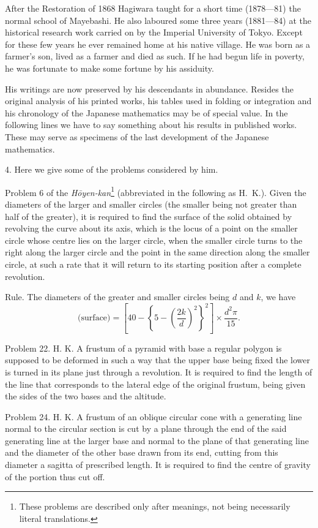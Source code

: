 \documentclass[11pt]{article}
\newcommand{\scanpage}[2]{\clearpage\setcounter{footnote}{0}\noindent{\footnotesize\color{gray}PDF page #1 · #2}\par\medskip}
\begin{document}
After the Restoration of 1868 Hagiwara taught for a short time (1878---81) the normal school of Mayebashi. He also laboured some three years (1881---84) at the historical research work carried on by the Imperial University of Tokyo. Except for these few years he ever remained home at his native village. He was born as a farmer's son, lived as a farmer and died as such. If he had begun life in poverty, he was fortunate to make some fortune by his assiduity.

His writings are now preserved by his descendants in abundance. Resides the original analysis of his printed works, his tables used in folding or integration and his chronology of the Japanese mathematics may be of special value. In the following lines we have to say something about his results in published works. These may serve as specimens of the last development of the Japanese mathematics.

4. Here we give some of the problems considered by him.

Problem 6 of the \emph{Hōyen-kan}\footnote{These problems are described only after meanings, not being necessarily literal translations.} (abbreviated in the following as H.~K.). Given the diameters of the larger and smaller circles (the smaller being not greater than half of the greater), it is required to find the surface of the solid obtained by revolving the curve about its axis, which is the locus of a point on the smaller circle whose centre lies on the larger circle, when the smaller circle turns to the right along the larger circle and the point in the same direction along the smaller circle, at such a rate that it will return to its starting position after a complete revolution.

\scanpage{0319}{printed page 305}
Rule. The diameters of the greater and smaller circles being $d$ and $k$, we have
\[
\text{(surface)} = \left[40 - \left\{5 - \left(\frac{2k}{d}\right)^{2}\right\}^{2}\right] \times \frac{d^{2}\pi}{15}.
\]

Problem 22. H. K. A frustum of a pyramid with base a regular polygon is supposed to be deformed in such a way that the upper base being fixed the lower is turned in its plane just through a revolution. It is required to find the length of the line that corresponds to the lateral edge of the original frustum, being given the sides of the two bases and the altitude.

Problem 24. H. K. A frustum of an oblique circular cone with a generating line normal to the circular section is cut by a plane through the end of the said generating line at the larger base and normal to the plane of that generating line and the diameter of the other base drawn from its end, cutting from this diameter a sagitta of prescribed length. It is required to find the centre of gravity of the portion thus cut off.
\end{document}

